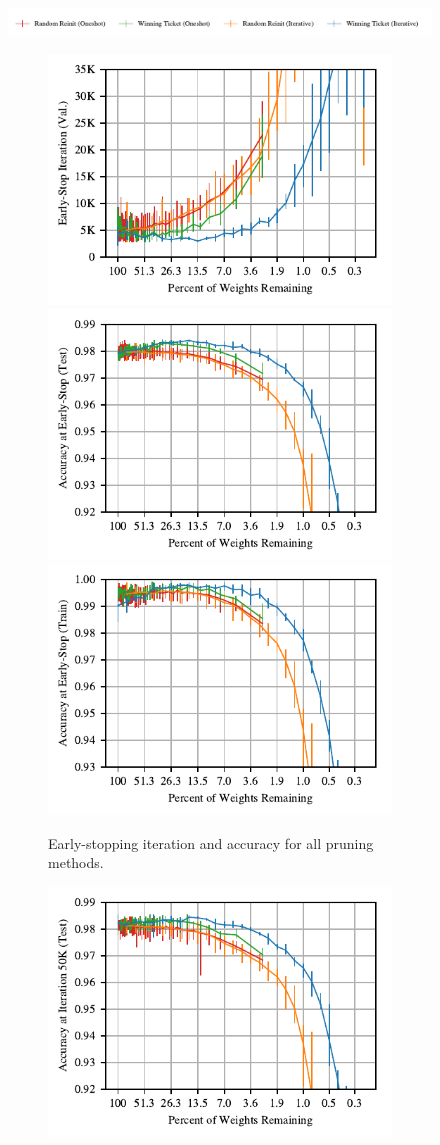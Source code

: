 \begin{figure}
\centering
\includegraphics[width=.8\textwidth]{graphs/mnist/lenet/all/legend}%
\vspace{-.5em}
\begin{subfigure}{\textwidth}
\vspace{-.5em}
\includegraphics[width=.33\textwidth]{graphs/mnist/lenet/all/iteration}%
\includegraphics[width=.33\textwidth]{graphs/mnist/lenet/all/accuracy}%
\includegraphics[width=.33\textwidth]{graphs/mnist/lenet/all/train_accuracy}%
\vspace{-.5em}
\caption{Early-stopping iteration and accuracy for all pruning methods.}
\end{subfigure}
\begin{subfigure}{.33\textwidth}
\includegraphics[width=\textwidth]{graphs/mnist/lenet/50k/accuracy}%

\end{subfigure}
\end{figure}
